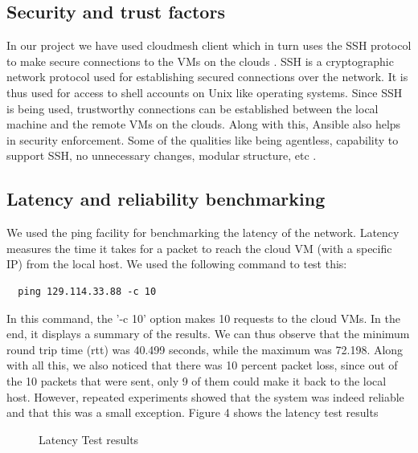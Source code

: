 \documentclass[9pt,twocolumn,twoside]{../../styles/osajnl}
\begin{document}
\subsection{Security and trust factors}
In our project we have used cloudmesh client which in turn uses the
SSH protocol to make secure connections to the VMs on the clouds
\cite{ssh-security}.  SSH is a cryptographic network protocol used for
establishing secured connections over the network.  It is thus used
for access to shell accounts on Unix like operating systems.  Since
SSH is being used, trustworthy connections can be established between
the local machine and the remote VMs on the clouds.  Along with this,
Ansible also helps in security enforcement.  Some of the qualities
like being agentless, capability to support SSH, no unnecessary
changes, modular structure, etc \cite{ansible-security}.

\subsection{Latency and reliability benchmarking}
We used the ping facility for benchmarking the latency
\cite{measuring-latency} of the network.  Latency measures the time it
takes for a packet to reach the cloud VM (with a specific IP) from the
local host.  We used the following command to test this:

\begin{lstlisting}
  ping 129.114.33.88 -c 10
\end{lstlisting}
	
In this command, the '-c 10' option makes 10 requests to the cloud
VMs.  In the end, it displays a summary of the results.  We can thus
observe that the minimum round trip time (rtt) was 40.499 seconds,
while the maximum was 72.198.  Along with all this, we also noticed
that there was 10 percent packet loss, since out of the 10 packets
that were sent, only 9 of them could make it back to the local host.
However, repeated experiments showed that the system was indeed
reliable and that this was a small exception.  Figure 4 shows the latency test results

\begin{figure}[htbp]
  \centering
  \caption{Latency Test results}
\end{figure}
\end{document}
